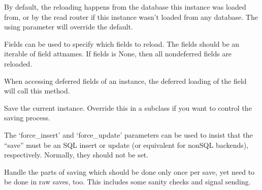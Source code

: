 \documentclass[letterpaper,10pt,english]{sphinxmanual}
\begin{document}
\begin{fulllineitems}
\begin{fulllineitems}
\sphinxAtStartPar
By default, the reloading happens from the database this instance was
loaded from, or by the read router if this instance wasn’t loaded from
any database. The using parameter will override the default.

\sphinxAtStartPar
Fields can be used to specify which fields to reload. The fields
should be an iterable of field attnames. If fields is None, then
all non\sphinxhyphen{}deferred fields are reloaded.

\sphinxAtStartPar
When accessing deferred fields of an instance, the deferred loading
of the field will call this method.

\end{fulllineitems}


\begin{fulllineitems}
\label{\detokenize{tasks:tasks.models.Task.save}}
\pysigstartsignatures
{}
\pysigstopsignatures
\sphinxAtStartPar
Save the current instance. Override this in a subclass if you want to
control the saving process.

\sphinxAtStartPar
The ‘force\_insert’ and ‘force\_update’ parameters can be used to insist
that the “save” must be an SQL insert or update (or equivalent for
non\sphinxhyphen{}SQL backends), respectively. Normally, they should not be set.

\end{fulllineitems}


\begin{fulllineitems}
\label{\detokenize{tasks:tasks.models.Task.save_base}}
\pysigstartsignatures
{}
\pysigstopsignatures
\sphinxAtStartPar
Handle the parts of saving which should be done only once per save,
yet need to be done in raw saves, too. This includes some sanity
checks and signal sending.


\end{fulllineitems}
\end{fulllineitems}
\end{document}
